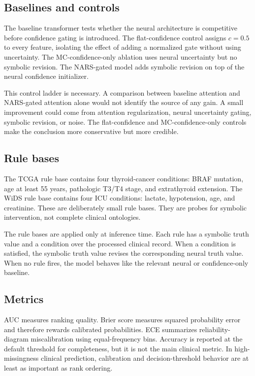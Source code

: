 \documentclass{article}
\begin{document}
\subsection{Baselines and controls}

The baseline transformer tests whether the neural architecture is competitive before confidence gating is introduced. The flat-confidence control assigns $c=0.5$ to every feature, isolating the effect of adding a normalized gate without using uncertainty. The MC-confidence-only ablation uses neural uncertainty but no symbolic revision. The NARS-gated model adds symbolic revision on top of the neural confidence initializer.

This control ladder is necessary. A comparison between baseline attention and NARS-gated attention alone would not identify the source of any gain. A small improvement could come from attention regularization, neural uncertainty gating, symbolic revision, or noise. The flat-confidence and MC-confidence-only controls make the conclusion more conservative but more credible.

\subsection{Rule bases}

The TCGA rule base contains four thyroid-cancer conditions: BRAF mutation, age at least 55 years, pathologic T3/T4 stage, and extrathyroid extension. The WiDS rule base contains four ICU conditions: lactate, hypotension, age, and creatinine. These are deliberately small rule bases. They are probes for symbolic intervention, not complete clinical ontologies.

The rule bases are applied only at inference time. Each rule has a symbolic truth value and a condition over the processed clinical record. When a condition is satisfied, the symbolic truth value revises the corresponding neural truth value. When no rule fires, the model behaves like the relevant neural or confidence-only baseline.

\subsection{Metrics}

AUC measures ranking quality. Brier score measures squared probability error and therefore rewards calibrated probabilities. ECE summarizes reliability-diagram miscalibration using equal-frequency bins. Accuracy is reported at the default threshold for completeness, but it is not the main clinical metric. In high-missingness clinical prediction, calibration and decision-threshold behavior are at least as important as rank ordering.
\end{document}
